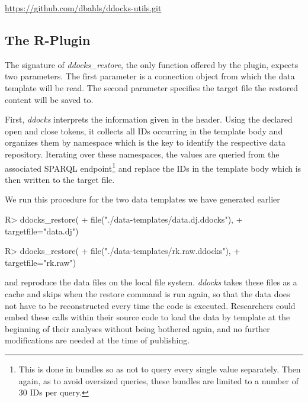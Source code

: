 \documentclass{acm_proc_article-sp}
\begin{document}
%
%
\url{https://github.com/dbahls/ddocks-utils.git}



\subsection{The R-Plugin}


The signature of \textit{ddocks\_restore}, the only function offered by the plugin, expects two parameters.
The first parameter is a connection object from which the data template will be read.
The second parameter specifies the target file the restored content will be saved to.

First, \textit{ddocks} interprets the information given in the header.
Using the declared open and close tokens, it collects all IDs occurring in the template body and organizes them by namespace which is the key to identify the respective data repository.
Iterating over these namespaces, the values are queried from the associated SPARQL endpoint\footnote{This is done in bundles so as not to query every single value separately. Then again, as to avoid oversized queries, these bundles are limited to a number of 30 IDs per query.}
and replace the IDs in the template body which is then written to the target file.



We run this procedure for the two data templates we have generated earlier
\begin{Schunk}
\begin{Sinput}
R> ddocks_restore(
+    file("./data-templates/data.dj.ddocks"), 
+    targetfile="data.dj")
\end{Sinput}
\end{Schunk}

\begin{Schunk}
\begin{Sinput}
R> ddocks_restore(
+    file("./data-templates/rk.raw.ddocks"), 
+    targetfile="rk.raw")
\end{Sinput}
\end{Schunk}
and reproduce the data files on the local file system.
\textit{ddocks} takes these files as a cache and skips when the restore command is run again, so that the data does not have to be reconstructed every time the code is executed.
Researchers could embed these calls within their source code to load the data by template at the beginning of their analyses without being bothered again, and no further modifications are needed at the time of publishing.
\end{document}
